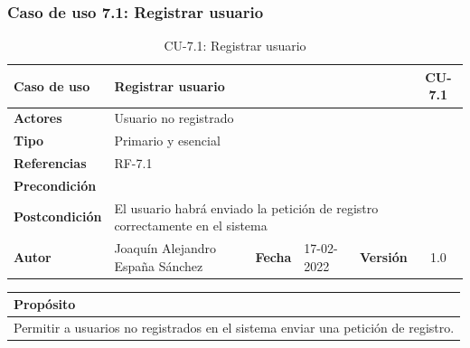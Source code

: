 \subsubsection{Caso de uso 7.1: Registrar usuario}

    \begin{table}[H]
    \begin{center}
        \begin{adjustbox}{width=\textwidth}
        \begin{tabular}{ | l | l | l | l | c | c | } 
            \hline
            \textbf{Caso de uso} & \multicolumn{4}{l|}{Registrar usuario} & \cellcolor{gray!50} \textbf{CU-7.1}\\
            \hline
            \textbf{Actores} & \multicolumn{5}{p{0.9\linewidth}|}{Usuario no registrado} \\
            \hline
            \textbf{Tipo} & \multicolumn{5}{l|}{Primario y esencial} \\
            \hline
            \textbf{Referencias} & \multicolumn{3}{l|}{RF-7.1} & \multicolumn{2}{l|}{ }\\
            \hline
            \textbf{Precondición} & \multicolumn{5}{l|}{ } \\
            \hline
            \textbf{Postcondición} & \multicolumn{5}{l|}{El usuario habrá enviado la petición de registro correctamente en el
            sistema} \\
            \hline
            \textbf{Autor} & \multicolumn{1}{p{0.25\linewidth}|}{Joaquín Alejandro España Sánchez} & \textbf{Fecha} & 
            17-02-2022     & \textbf{Versión}                                                      & 1.0\\
            \hline
        \end{tabular}
        \end{adjustbox}
        \caption{CU-7.1: Registrar usuario}
        \label{tab:register-user}
    \end{center}
    \end{table}

    \begin{table}[H]
        \centering
        \begin{tabularx}{\textwidth}{@{} |L |@{}} \hline
            \textbf{Propósito} \\
            \hline
            Permitir a usuarios no registrados en el sistema enviar una petición de registro. \\
            \hline
        \end{tabularx}
    \end{table}

